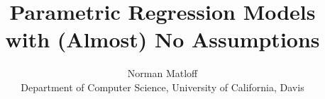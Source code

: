\documentclass{article}
\begin{document}
\title{Parametric Regression Models with (Almost) No Assumptions}
\author{Norman Matloff \\
  Department of Computer Science, University of California, Davis
}

\maketitle
\end{document}
